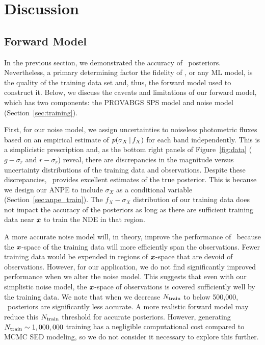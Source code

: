 \section{Discussion} \label{sec:discuss}
\subsection{Forward Model} \label{sec:forward-model}
In the previous section, we demonstrated the accuracy of \sedflow~posteriors. 
Nevertheless, a primary determining factor the fidelity of \sedflow, or any ML
model, is the quality of the training data set and, thus, the forward model
used to construct it. 
Below, we discuss the caveats and limitations of our forward model, which has
two components: the PROVABGS SPS model and noise model 
(Section~\ref{sec:training}).

First, for our noise model, we assign uncertainties to noiseless photometric
fluxes based on an empirical estimate of $p(\sigma_X\,|\, f_X)$ for each band
independently. 
This is a simplicistic prescription and, as the bottom right panels of
Figure~\ref{fig:data} ($g - \sigma_r$ and $r - \sigma_r$) reveal, there are
discrepancies in the magnitude versus uncertainty distributions of the training
data and observations. 
Despite these discrepancies, \sedflow~provides excellent estimates of the true
posterior.  
This is because we design our ANPE to include $\sigma_X$ as a conditional
variable (Section~\ref{sec:anpe_train}).
The $f_X-\sigma_X$ distribution of our training data does not impact the
accuracy of the posteriors as long as there are sufficient training data near
$\textbf{\textit{x}}$ to train the NDE in that region.

A more accurate noise model will, in theory, improve the performance of
\sedflow~because the $\textbf{\textit{x}}$-space of the training data will more efficiently 
span the observations. 
Fewer training data would be expended in regions of $\textbf{\textit{x}}$-space that are
devoid of observations.  
However, for our application, we do not find significantly  
improved performance when we alter the noise model.
This suggests that even with our simplistic noise model, the $\textbf{\textit{x}}$-space of
observations is covered sufficiently well by the training data. 
We note that when we decrease $N_{\rm train}$ to below 500,000,
\sedflow~posteriors are significantly less accurate. 
A more realistic forward model may reduce this $N_{\rm train}$ threshold for
accurate posteriors. 
However, generating $N_{\rm train} \sim 1,000,000$ training has a negligible
computational cost compared to MCMC SED modeling, so we do not consider it
necessary to explore this further. 


